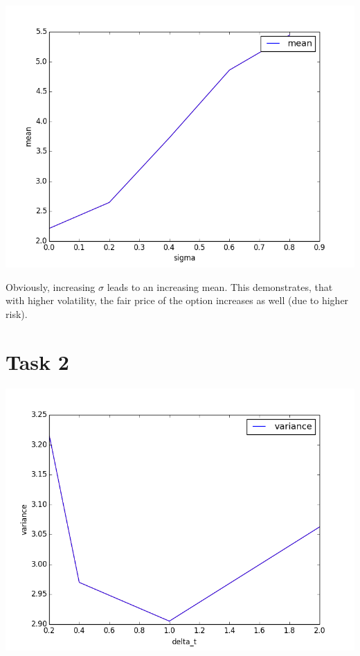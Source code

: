 \documentclass[10pt,a4paper]{article}
\begin{document}
\begin{center}
\includegraphics[scale=0.5]{task_1.png}		
\end{center}	

Obviously, increasing $\sigma$ leads to an increasing mean. This demonstrates, that with higher volatility, the fair price of the option increases as well (due to higher risk).

\section*{Task 2}

\begin{center}
\includegraphics[scale=0.5]{task_2.png}		
\end{center}	
\end{document}
